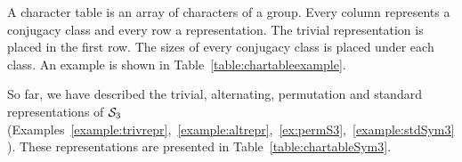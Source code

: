 \begin{notation}
	A character table is an array of characters of a group.  Every column represents a conjugacy class and every row a representation. The trivial representation is placed in the first row. The sizes of every conjugacy class is placed under each class. An example is shown in Table~\ref{table:chartableexample}.
\end{notation}

\begin{example}
	So far, we have described the trivial, alternating, permutation and standard representations of $\mathcal{S}_3$ (Examples~\ref{example:trivrepr},~\ref{example:altrepr},~\ref{ex:permS3},~\ref{example:stdSym3}). %
	These representations are presented in Table~\ref{table:chartableSym3}.
\end{example}

